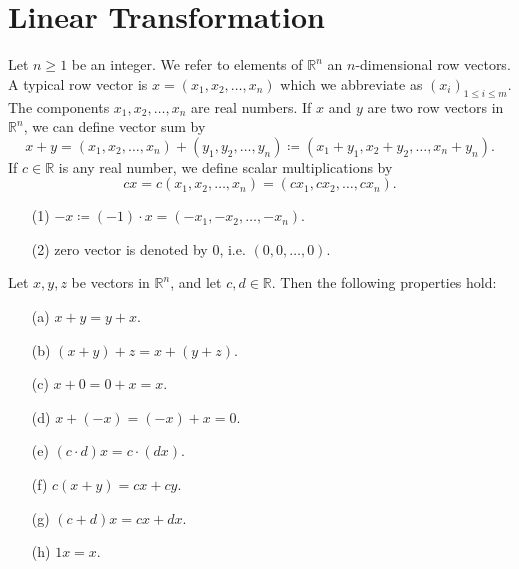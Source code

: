 \section{Linear Transformation}
\begin{definition}
    Let \(n \ge 1\) be an integer. We refer to elements of \(\mathbb{R} ^n\) an \(n\)-dimensional row vectors. A typical row vector is \(x = (x_1, x_2, \dots , x_n )\) which we abbreviate as \((x_i)_{1 \le i \le m}\). The components \(x_1, x_2, \dots , x_n\) are real numbers. If \(x\) and \(y\) are two row vectors in \(\mathbb{R} ^n\), we can define vector sum by 
    \[
        x + y = (x_1, x_2, \dots , x_n) + (y_1, y_2, \dots , y_n) \coloneqq (x_1 + y_1, x_2 + y_2, \dots , x_n + y_n).
    \]    
    If \(c \in \mathbb{R} \) is any real number, we define scalar multiplications by 
    \[
        c x = c (x_1, x_2, \dots , x_n) = (cx_1, cx_2, \dots , cx_n).
    \] 
\end{definition}

\begin{remark}
    \hfill
    \begin{itemize}
        \item [(1)] \(- x \coloneqq (-1) \cdot x = (-x_1, -x_2, \dots , -x_n)\). 
        \item [(2)] zero vector is denoted by \(0\), i.e. \((0, 0, \dots , 0)\).   
    \end{itemize}
\end{remark}

\begin{lemma}
    Let \(x, y, z\) be vectors in \(\mathbb{R} ^n\), and let \(c, d \in \mathbb{R} \). Then the following properties hold: 
    \begin{itemize}
        \item [(a)] \(x + y = y + x\). 
        \item [(b)] \((x + y) + z = x + (y + z)\). 
        \item [(c)] \(x + 0 = 0 + x = x\). 
        \item [(d)] \(x + (-x) = (-x) + x = 0\). 
        \item [(e)] \((c \cdot d) x = c \cdot (dx)\).
        \item [(f)] \(c(x + y) = cx + cy\).
        \item [(g)] \((c + d)x = cx + dx\). 
        \item [(h)] \(1x = x\).        
    \end{itemize}   
\end{lemma}

